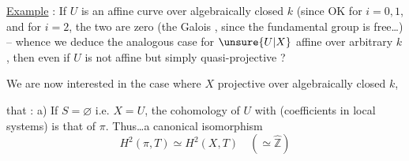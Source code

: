 \uline{Example} :  If $U$ is an affine curve
over algebraically closed $k$  (since OK for $i=0,1$, and
for $i=2$, the two  are zero
(the Galois , since the fundamental group
 is  free\ldots) -- whence we deduce the
analogous case for $\unsure{U|X}$ affine over arbitrary $k$,
then even if $U$ is not affine but
simply quasi-projective ? 

We are now interested in the
case where $X$ projective  over algebraically closed $k$, 

that : 
a) If $S=\varnothing$ i.e. $X=U$, the cohomology of $U$
with (coefficients in local systems) is that
of $\pi$. Thus\ldots a canonical isomorphism
\[
H^2(\pi,T)\simeq H^2(X,T)\quad(\simeq\widehat{\mathbb Z})
\]

